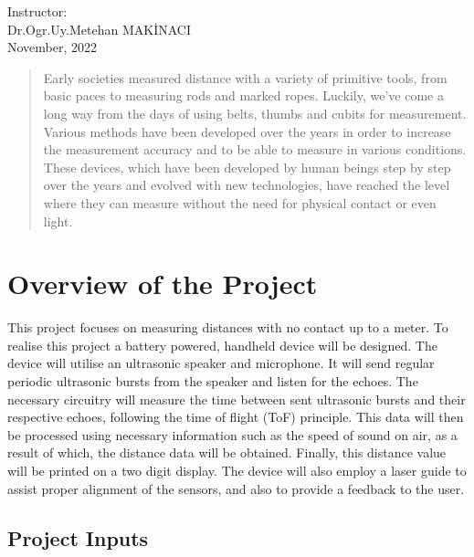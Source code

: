 \documentclass[12pt, a4paper]{article}
\begin{document}
\begin{titlepage}
\begin{center}
            Instructor:\\ Dr.Ogr.Uy.Metehan MAKİNACI\\

            \vspace*{1 cm}
            November, 2022


        \end{center}

    \end{titlepage}



    \pagebreak

    \begin{abstract}
        Early societies measured distance with a variety of primitive tools, from basic paces to measuring rods and marked ropes. Luckily, we’ve come a long way from the days of using belts, thumbs and cubits for measurement. Various methods have been developed over the years in order to increase the measurement accuracy and to be able to measure in various conditions. These devices, which have been developed by human beings step by step over the years and evolved with new technologies, have reached the level where they can measure without the need for physical contact or even light.
    \end{abstract}

    \section{Overview of the Project}

        This project focuses on measuring distances with no contact up to a meter. To realise this project a battery powered, handheld device will be designed. The device will utilise an ultrasonic speaker and microphone. It will send regular periodic ultrasonic bursts from the speaker and listen for the echoes. The necessary circuitry will measure the time between sent ultrasonic bursts and their respective echoes, following the time of flight (ToF) principle. This data will then be processed using necessary information such as the speed of sound on air, as a result of which, the distance data will be obtained. Finally, this distance value will be printed on a two digit display. The device will also employ a laser guide to assist proper alignment of the sensors, and also to provide a feedback to the user. 


        \subsection{Project Inputs}
\end{document}
